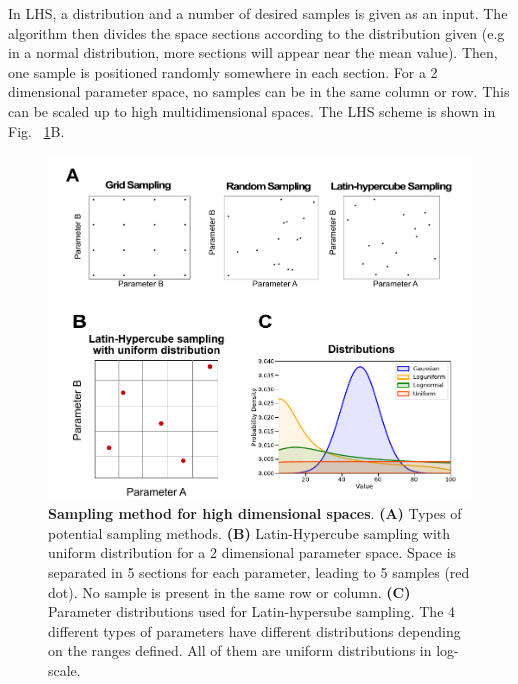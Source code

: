 In LHS, a distribution and a number of desired samples is given as an input.
The algorithm then divides the space sections according to the distribution given (e.g in a normal distribution, more sections will appear near the mean value).
Then, one sample is positioned randomly somewhere in each section.
For a 2 dimensional parameter space, no samples can be in the same column or row.
This can be scaled up to high multidimensional spaces. %
The LHS scheme is shown in Fig. ~\ref{distributions}B.
\begin{figure}[H]

    \includegraphics[width=1\textwidth]{chapters/Methods/distributions}
    \caption{\textbf{Sampling method for high dimensional spaces}. \textbf{(A)} Types of potential sampling methods. \textbf{(B)} Latin-Hypercube sampling with uniform distribution for a 2 dimensional parameter space. Space is separated in 5 sections for each parameter, leading to 5 samples (red dot). No sample is present in the same row or column. \textbf{(C)} Parameter distributions used for Latin-hypersube sampling. The 4 different types of parameters have different distributions depending on the ranges defined. All of them are uniform distributions in log-scale. }
    \label{distributions}
\end{figure}
